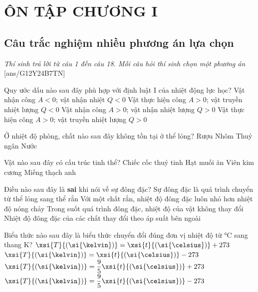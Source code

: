 \section{ÔN TẬP CHƯƠNG I}
\subsection{Câu trắc nghiệm nhiều phương án lựa chọn}
\textit{Thí sinh trả lời từ câu 1 đến câu 18. Mỗi câu hỏi thí sinh chọn một phương án}
[ans/G12Y24B7TN]
\begin{ex}
	Quy ước dấu nào sau đây phù hợp với định luật I của nhiệt động lực học?
	\choice
	{Vật nhận công $A<0$; vật nhận nhiệt $Q<0$}
	{Vật thực hiện công $A>0$; vật truyền nhiệt lượng $Q<0$}
	{\True Vật nhận công $A>0$; vật nhận nhiệt lượng $Q>0$}
	{Vật thực hiện công $A>0$; vật truyền nhiệt lượng $Q>0$}
	\loigiai{}
\end{ex}
\begin{ex}
	Ở nhiệt độ phòng, chất nào sau đây không tồn tại ở thể lỏng?
	\choice
	{Rượu}
	{\True Nhôm}
	{Thuỷ ngân}
	{Nước}
	\loigiai{}
\end{ex}
\begin{ex}
	Vật nào sau đây có cấu trúc tinh thể?
	\choice
	{\True Chiếc cốc thuỷ tinh}
	{Hạt muối ăn}
	{Viên kim cương}
	{Miếng thạch anh}
	\loigiai{}
\end{ex}
\begin{ex}
Điều nào sau đây là \textbf{sai} khi nói về sự đông đặc?	
	\choice
	{Sự đông đặc là quá trình chuyển từ thể lỏng sang thể rắn}
	{\True Với một chất rắn, nhiệt độ đông đặc luôn nhỏ hơn nhiệt độ nóng chảy}
	{Trong suốt quá trình đông đặc, nhiệt độ của vật không thay đổi}
	{Nhiệt độ đông đặc của các chất thay đổi theo áp suất bên ngoài}
	\loigiai{}
\end{ex}
\begin{ex}
	Biểu thức nào sau đây là biểu thức chuyển đổi đúng đơn vị nhiệt độ từ $\si{\celsius}$ sang thang $\si{\kelvin}$?
	\choice
	{\True $\xsi{T}{\left(\si{\kelvin}\right)}=\xsi{t}{\left(\si{\celsius}\right)}+273$}
	{$\xsi{T}{\left(\si{\kelvin}\right)}=\xsi{t}{\left(\si{\celsius}\right)}-273$}
	{$\xsi{T}{\left(\si{\kelvin}\right)}=\dfrac{9}{5}\xsi{t}{\left(\si{\celsius}\right)}+273$}
	{$\xsi{T}{\left(\si{\kelvin}\right)}=\dfrac{9}{5}\xsi{t}{\left(\si{\celsius}\right)}-273$}
	\loigiai{}
\end{ex}
